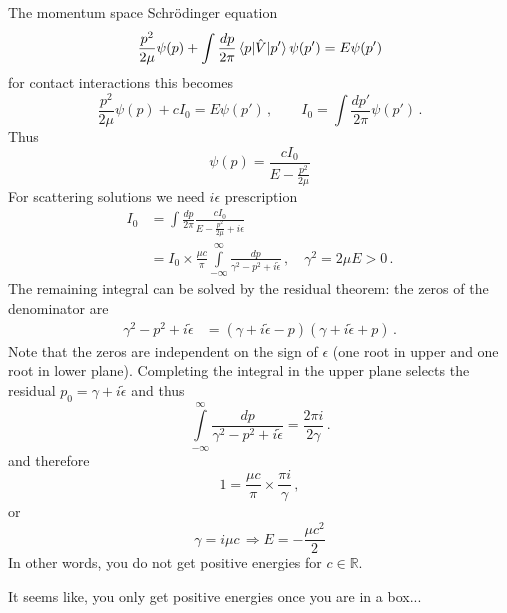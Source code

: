 \documentclass[aps, prl, showkeys, nofootinbib, twocolumn, floatfix]{revtex4-1}
\begin{document}
The momentum space Schrödinger equation
\begin{equation}
	\frac{p^2}{2 \mu} \psi(p) + \int \frac{d p}{2\pi} \braket{p | \hat V | p'} \psi(p') = E \psi(p')
\end{equation}
for contact interactions this becomes
\begin{equation}
	\frac{p^2}{2 \mu} \psi(p) +  c I_0 = E \psi(p') \, , \qquad I_0 = \int \frac{d p'}{2\pi} \psi(p') \, .
\end{equation}
Thus
\begin{equation}
	\psi(p) = \frac{c I_0}{E - \frac{p^2}{2\mu}}
\end{equation}
For scattering solutions we need $i\epsilon$ prescription
\begin{align}
	I_0 &= \int \frac{d p}{2\pi}  \frac{c I_0}{E - \frac{p^2}{2\mu} + i \epsilon} \\
	&= I_0 \times \frac{\mu c }{\pi} \int\limits_{ - \infty}^{\infty} \frac{d p}{\gamma^2 - {p^2} + i \tilde\epsilon} \, , \quad \gamma^2 = 2 \mu E > 0\,.
\end{align}
The remaining integral can be solved by the residual theorem: the zeros of the denominator are
\begin{align}
	\gamma^2 - {p^2} + i \tilde\epsilon &= (\gamma + i \tilde\epsilon - p)(\gamma + i \tilde\epsilon + p) \, .
\end{align}
Note that the zeros are independent on the sign of $\epsilon$ (one root in upper and one root in lower plane).
Completing the integral in the upper plane selects the residual $p_0 = \gamma + i \tilde \epsilon$ and thus
\begin{equation}
	\int\limits_{ - \infty}^{\infty} \frac{d p}{\gamma^2 - {p^2} + i \tilde\epsilon}
	=
	 \frac{2 \pi i}{2 \gamma} \, .
\end{equation}
and therefore
\begin{equation}
	1 = \frac{\mu c}{\pi} \times \frac{\pi i}{\gamma} \, ,
\end{equation}
or
\begin{equation}
	\gamma = i \mu c \, \Rightarrow  E = - \frac{\mu c^2}{2}
\end{equation}
In other words, you do not get positive energies for $c \in \mathbb{R}$.

It seems like, you only get positive energies once you are in a box...
\end{document}
